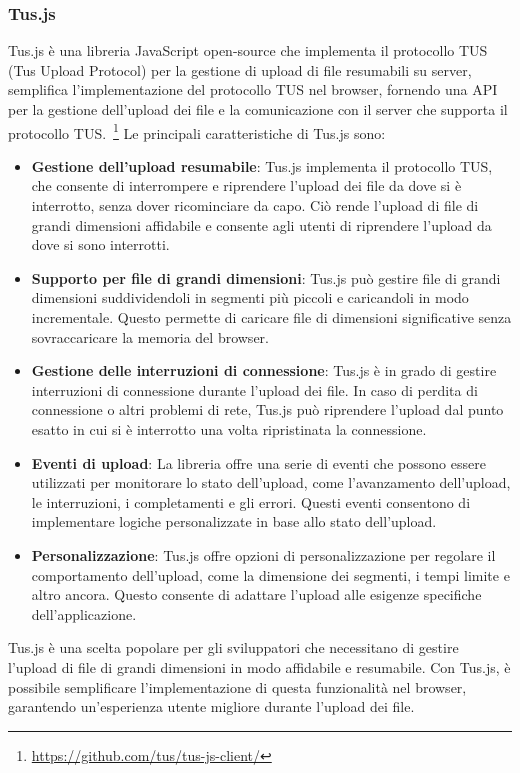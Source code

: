 \subsubsection{Tus.js}
Tus.js è una libreria JavaScript open-source che implementa il protocollo TUS (Tus Upload Protocol) per la gestione di upload di file resumabili su server, semplifica l'implementazione del protocollo TUS nel browser, fornendo una API per la gestione dell'upload dei file e la comunicazione con il server che supporta il protocollo TUS.~\footnote{\url{https://github.com/tus/tus-js-client/}}
Le principali caratteristiche di Tus.js sono:
\begin{itemize}
    \item \textbf{Gestione dell'upload resumabile}: Tus.js implementa il protocollo TUS, che consente di interrompere e riprendere l'upload dei file da dove si è interrotto, senza dover ricominciare da capo. Ciò rende l'upload di file di grandi dimensioni affidabile e consente agli utenti di riprendere l'upload da dove si sono interrotti.
  \item \textbf{Supporto per file di grandi dimensioni}: Tus.js può gestire file di grandi dimensioni suddividendoli in segmenti più piccoli e caricandoli in modo incrementale. Questo permette di caricare file di dimensioni significative senza sovraccaricare la memoria del browser.
  \item \textbf{Gestione delle interruzioni di connessione}: Tus.js è in grado di gestire interruzioni di connessione durante l'upload dei file. In caso di perdita di connessione o altri problemi di rete, Tus.js può riprendere l'upload dal punto esatto in cui si è interrotto una volta ripristinata la connessione.
  \item \textbf{Eventi di upload}: La libreria offre una serie di eventi che possono essere utilizzati per monitorare lo stato dell'upload, come l'avanzamento dell'upload, le interruzioni, i completamenti e gli errori. Questi eventi consentono di implementare logiche personalizzate in base allo stato dell'upload.
  \item \textbf{Personalizzazione}: Tus.js offre opzioni di personalizzazione per regolare il comportamento dell'upload, come la dimensione dei segmenti, i tempi limite e altro ancora. Questo consente di adattare l'upload alle esigenze specifiche dell'applicazione.
\end{itemize}
Tus.js è una scelta popolare per gli sviluppatori che necessitano di gestire l'upload di file di grandi dimensioni in modo affidabile e resumabile. Con Tus.js, è possibile semplificare l'implementazione di questa funzionalità nel browser, garantendo un'esperienza utente migliore durante l'upload dei file.
